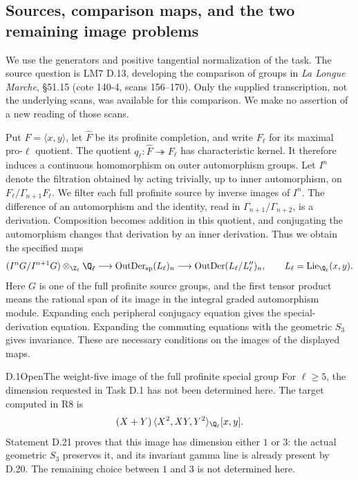 \subsection{Sources, comparison maps, and the two remaining image problems}

We use the generators and positive tangential normalization of the task.
The source question is LM7 D.13, developing the comparison of groups in
\emph{La Longue Marche}, \S51.15 (cote 140-4, scans 156--170).
Only the supplied transcription, not the underlying scans, was available
for this comparison. We make no assertion of a new reading of those scans.

Put $F=\langle x,y\rangle$, let $\widehat F$ be its profinite completion,
and write $F_\ell$ for its maximal pro-$\ell$ quotient. The quotient
$q_\ell:\widehat F\twoheadrightarrow F_\ell$ has characteristic kernel.
It therefore induces a continuous homomorphism on outer automorphism
groups. Let $I^n$ denote the filtration obtained by acting trivially,
up to inner automorphism, on $F_\ell/\Gamma_{n+1}F_\ell$.
We filter each full profinite source by inverse images of $I^n$.
The difference of an automorphism and the identity, read in
$\Gamma_{n+1}/\Gamma_{n+2}$, is a derivation. Composition becomes addition
in this quotient, and conjugating the automorphism changes that
derivation by an inner derivation. Thus we obtain the specified maps
\[
 (I^nG/I^{n+1}G)\otimes_{\Z_\ell}\Q_\ell
 \longrightarrow \operatorname{OutDer}_{\mathrm{sp}}(L_\ell)_n
 \longrightarrow \operatorname{OutDer}(L_\ell/L_\ell'')_n,
 \qquad L_\ell=\operatorname{Lie}_{\Q_\ell}(x,y).
\]
Here $G$ is one of the full profinite source groups, and the first
tensor product means the rational span of its image in the integral
graded automorphism module. Expanding each peripheral conjugacy equation
gives the special-derivation equation. Expanding the commuting equations
with the geometric $S_3$ gives invariance. These are necessary conditions
on the images of the displayed maps.

\begin{statement}{D.1}{Open}{The weight-five image of the full profinite special group}
For $\ell\geq5$, the dimension requested in Task D.1 has not been
determined here. The target computed in R8 is
\[
 (X+Y)\,\langle X^2,XY,Y^2\rangle_{\Q_\ell}[x,y].
\]
Statement D.21 proves that this image has dimension either $1$ or $3$:
the actual geometric $S_3$ preserves it, and its invariant gamma line
is already present by D.20. The remaining choice between $1$ and $3$
is not determined here.
\end{statement}

